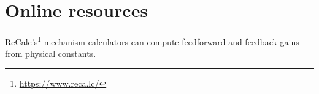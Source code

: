 \section{Online resources}

ReCalc's\footnote{\url{https://www.reca.lc/}} mechanism calculators can compute
feedforward and feedback gains from physical constants.
